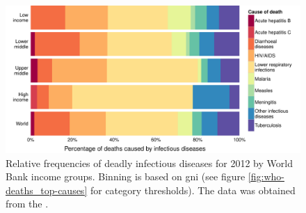 \begin{knitrout}
\color{fgcolor}\begin{figure}
\includegraphics[width=\maxwidth]{figures/R/who-deaths/byDisease-who-deaths_by-disease-1} \caption[Relative frequencies of deadly infectious diseases for 2012 by World Bank income groups.]{Relative frequencies of deadly infectious diseases for 2012 by World Bank income groups. Binning is based on \acrfull{gni} (see figure \ref{fig:who-deaths_top-causes} for category thresholds). The data was obtained from the \citet{WHO2012}.}\label{fig:who-deaths_by-disease}
\end{figure}


\end{knitrout}

\newcommand{\knitrPercentageInfectTwelveWorldLRI}{34.5\%}
\newcommand{\knitrPercentageInfectTwelveHighLRI}{57.7\%}
\newcommand{\knitrPercentageInfectTwelveUmidLRI}{43.5\%}
\newcommand{\knitrPercentageInfectTwelveLmidLRI}{30.8\%}
\newcommand{\knitrPercentageInfectTwelveLowLRI}{28.7\%}
\newcommand{\knitrPercentageInfectTwelveHighDiarr}{5.6\%}
\newcommand{\knitrPercentageInfectTwelveUmidDiarr}{7\%}
\newcommand{\knitrPercentageInfectTwelveLmidDiarr}{21.4\%}
\newcommand{\knitrPercentageInfectTwelveLowDiarr}{16.6\%}
\newcommand{\knitrPercentageInfectTwelveWorldAIDS}{17.3\%}
\newcommand{\knitrPercentageInfectTwelveWorldDiarr}{16.9\%}
\newcommand{\knitrPercentageInfectTwelveHighAIDS}{11.3\%}
\newcommand{\knitrPercentageInfectTwelveUmidAIDS}{26.2\%}
\newcommand{\knitrPercentageInfectTwelveLmidAIDS}{13.3\%}
\newcommand{\knitrPercentageInfectTwelveLowAIDS}{20.4\%}
